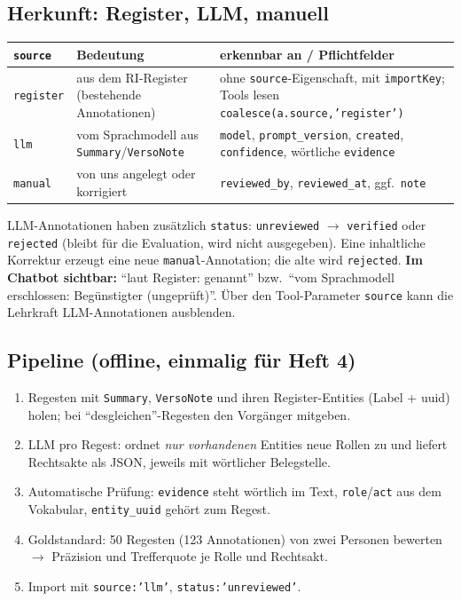 \documentclass[10pt,a4paper]{article}
\newcommand{\code}[1]{\texttt{\small #1}}
\begin{document}
\subsection{Herkunft: Register, LLM, manuell}

\begin{small}
\begin{tabularx}{\textwidth}{@{}lp{5.5cm}L@{}}
\toprule
\code{source} & Bedeutung & erkennbar an / Pflichtfelder\\\midrule
\code{register} & aus dem RI-Register (bestehende Annotationen) & ohne \code{source}-Eigenschaft, mit \code{importKey}; Tools lesen \code{coalesce(a.source,'register')}\\
\code{llm} & vom Sprachmodell aus \code{Summary}/\code{VersoNote} & \code{model}, \code{prompt\_version}, \code{created}, \code{confidence}, wörtliche \code{evidence}\\
\code{manual} & von uns angelegt oder korrigiert & \code{reviewed\_by}, \code{reviewed\_at}, ggf.\ \code{note}\\
\bottomrule
\end{tabularx}
\end{small}

\medskip
LLM-Annotationen haben zusätzlich \code{status}: \code{unreviewed} $\to$ \code{verified} oder \code{rejected} (bleibt für die Evaluation, wird nicht ausgegeben). Eine inhaltliche Korrektur erzeugt eine neue \code{manual}-Annotation; die alte wird \code{rejected}.
\textbf{Im Chatbot sichtbar:} \enquote{laut Register: genannt} bzw.\ \enquote{vom Sprachmodell erschlossen: Begünstigter (ungeprüft)}. Über den Tool-Parameter \code{source} kann die Lehrkraft LLM-Annotationen ausblenden.

\subsection{Pipeline (offline, einmalig für Heft 4)}
\begin{enumerate}
\item Regesten mit \code{Summary}, \code{VersoNote} und ihren Register-Entities (Label + uuid) holen; bei \enquote{desgleichen}-Regesten den Vorgänger mitgeben.
\item LLM pro Regest: ordnet \emph{nur vorhandenen} Entities neue Rollen zu und liefert Rechtsakte als JSON, jeweils mit wörtlicher Belegstelle.
\item Automatische Prüfung: \code{evidence} steht wörtlich im Text, \code{role}/\code{act} aus dem Vokabular, \code{entity\_uuid} gehört zum Regest.
\item Goldstandard: 50 Regesten (123 Annotationen) von zwei Personen bewerten $\to$ Präzision und Trefferquote je Rolle und Rechtsakt.
\item Import mit \code{source:'llm'}, \code{status:'unreviewed'}.
\end{enumerate}
\end{document}
